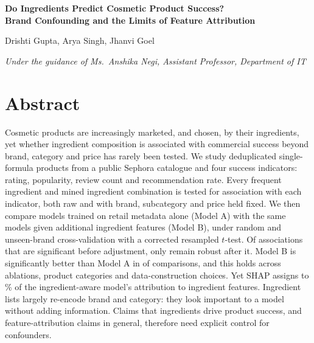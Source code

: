 \documentclass[11pt,a4paper]{article}
\newcommand{\draft}[1]{{\color{blue!70!black}#1}}
\begin{document}
\begin{center}
{\LARGE\bfseries Do Ingredients Predict Cosmetic Product Success?\\[2pt]
Brand Confounding and the Limits of Feature Attribution\par}
\vspace{8pt}
{\large Drishti Gupta, Arya Singh, Jhanvi Goel\par}
\vspace{2pt}
{\itshape Under the guidance of Ms.\ Anshika Negi, Assistant Professor, Department of IT\par}
\end{center}

\section*{Abstract}
\draft{Cosmetic products are increasingly marketed, and chosen, by their ingredients, yet whether ingredient composition is associated with commercial success beyond brand, category and price has rarely been tested. We study \NAnalysed{} deduplicated single-formula products from a public Sephora catalogue and four success indicators: rating, popularity, review count and recommendation rate. Every frequent ingredient and mined ingredient combination is tested for association with each indicator, both raw and with brand, subcategory and price held fixed. We then compare models trained on retail metadata alone (Model A) with the same models given \NIngredientFeatures{} additional ingredient features (Model B), under random and unseen-brand cross-validation with a corrected resampled $t$-test. Of \NSigRaw{} associations that are significant before adjustment, only \NRobust{} remain robust after it. Model B is significantly better than Model A in \NBBetter{} of \NComparisons{} comparisons, and this holds across ablations, product categories and data-construction choices. Yet SHAP assigns \MinIngredientShare{} to \MaxIngredientShare{}\% of the ingredient-aware model's attribution to ingredient features. Ingredient lists largely re-encode brand and category: they look important to a model without adding information. Claims that ingredients drive product success, and feature-attribution claims in general, therefore need explicit control for confounders.}

\end{document}
